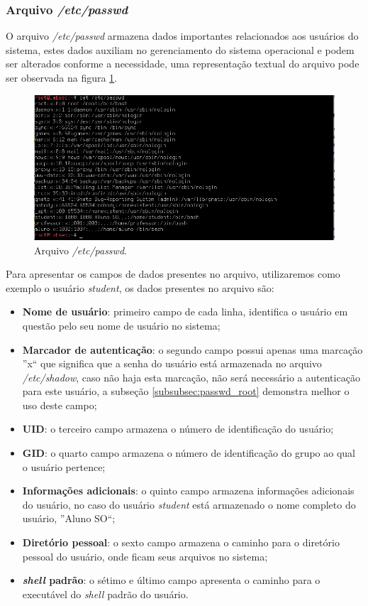 \documentclass[
  12pt,				%
  oneside,   	        %
  a4paper,			%
  english,			%
  french,				%
  spanish,			%
  brazil,				%
  ]{pacotes/abntex2}
\begin{document}
\subsubsection{Arquivo \textit{/etc/passwd}}
O arquivo \textit{/etc/passwd} armazena dados importantes relacionados aos usuários do sistema, estes dados auxiliam no gerenciamento do sistema operacional e podem ser alterados conforme a necessidade, uma representação textual do arquivo pode ser observada na figura \ref{fig:passwd}. 

\begin{figure}[H]
  \centering
  \includegraphics[scale=0.7]{figuras/passwd.png}
  \caption{Arquivo \textit{/etc/passwd}.}
  \label{fig:passwd}
\end{figure}

Para apresentar os campos de dados presentes no arquivo, utilizaremos como exemplo o usuário \textit{student}, os dados presentes no arquivo são:

\begin{itemize}
    \item \textbf{Nome de usuário}: primeiro campo de cada linha, identifica o usuário em questão pelo seu nome de usuário no sistema;
    \item \textbf{Marcador de autenticação}: o segundo campo possui apenas uma marcação ''x`` que significa que a senha do usuário está armazenada no arquivo \textit{/etc/shadow}, caso não haja esta marcação, não será necessário a autenticação para este usuário, a subseção \ref{subsubsec:passwd_root} demonstra melhor o uso deste campo;
    \item \textbf{UID}: o terceiro campo armazena o número de identificação do usuário;
    \item \textbf{GID}: o quarto campo armazena o número de identificação do grupo ao qual o usuário pertence;
    \item \textbf{Informações adicionais}: o quinto campo armazena informações adicionais do usuário, no caso do usuário \textit{student} está armazenado o nome completo do usuário, ''Aluno SO``;
    \item \textbf{Diretório pessoal}: o sexto campo armazena o caminho para o diretório pessoal do usuário, onde ficam seus arquivos no sistema;
    \item \textbf{\textit{shell} padrão}: o sétimo e último campo apresenta o caminho para o executável do \textit{shell} padrão do usuário.
\end{itemize}
\end{document}

